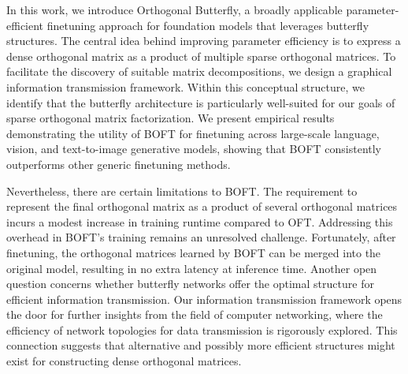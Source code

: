 In this work, we introduce Orthogonal Butterfly, a broadly applicable parameter-efficient finetuning approach for foundation models that leverages butterfly structures. The central idea behind improving parameter efficiency is to express a dense orthogonal matrix as a product of multiple sparse orthogonal matrices. To facilitate the discovery of suitable matrix decompositions, we design a graphical information transmission framework. Within this conceptual structure, we identify that the butterfly architecture is particularly well-suited for our goals of sparse orthogonal matrix factorization. We present empirical results demonstrating the utility of BOFT for finetuning across large-scale language, vision, and text-to-image generative models, showing that BOFT consistently outperforms other generic finetuning methods.

Nevertheless, there are certain limitations to BOFT. The requirement to represent the final orthogonal matrix as a product of several orthogonal matrices incurs a modest increase in training runtime compared to OFT. Addressing this overhead in BOFT's training remains an unresolved challenge. Fortunately, after finetuning, the orthogonal matrices learned by BOFT can be merged into the original model, resulting in no extra latency at inference time. Another open question concerns whether butterfly networks offer the optimal structure for efficient information transmission. Our information transmission framework opens the door for further insights from the field of computer networking, where the efficiency of network topologies for data transmission is rigorously explored. This connection suggests that alternative and possibly more efficient structures might exist for constructing dense orthogonal matrices.

